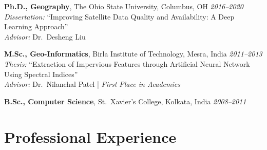 \documentclass[10pt,letterpaper]{article}
\begin{document}
\begin{entrylist}
  \item \textbf{Ph.D., Geography}, The Ohio State University, Columbus, OH \hfill \textit{2016--2020}\\
  \emph{Dissertation:} ``Improving Satellite Data Quality and Availability: A Deep Learning Approach''\\
  \emph{Advisor:} Dr.\ Desheng Liu

  \item \textbf{M.Sc., Geo-Informatics}, Birla Institute of Technology, Mesra, India \hfill \textit{2011--2013}\\
  \emph{Thesis:} ``Extraction of Impervious Features through Artificial Neural Network Using Spectral Indices''\\
  \emph{Advisor:} Dr.\ Nilanchal Patel \;|\; \emph{First Place in Academics}

  \item \textbf{B.Sc., Computer Science}, St.\ Xavier's College, Kolkata, India \hfill \textit{2008--2011}
\end{entrylist}

\section*{Professional Experience}
\end{document}
